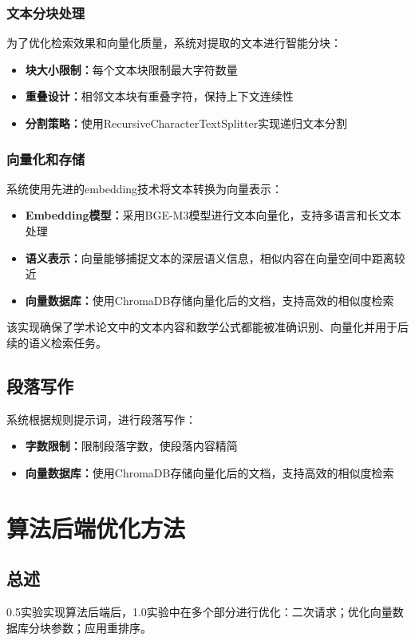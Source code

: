 \documentclass[12pt,a4paper]{article}
\begin{document}
\subsubsection{文本分块处理}
为了优化检索效果和向量化质量，系统对提取的文本进行智能分块：
\begin{itemize}
    \item \textbf{块大小限制：}每个文本块限制最大字符数量
    \item \textbf{重叠设计：}相邻文本块有重叠字符，保持上下文连续性
    \item \textbf{分割策略：}使用RecursiveCharacterTextSplitter实现递归文本分割
\end{itemize}

\subsubsection{向量化和存储}
系统使用先进的embedding技术将文本转换为向量表示：
\begin{itemize}
    \item \textbf{Embedding模型：}采用BGE-M3模型进行文本向量化，支持多语言和长文本处理
    \item \textbf{语义表示：}向量能够捕捉文本的深层语义信息，相似内容在向量空间中距离较近
    \item \textbf{向量数据库：}使用ChromaDB存储向量化后的文档，支持高效的相似度检索
\end{itemize}

该实现确保了学术论文中的文本内容和数学公式都能被准确识别、向量化并用于后续的语义检索任务。

\subsection{段落写作}
系统根据规则提示词，进行段落写作：
\begin{itemize}
    \item \textbf{字数限制：}限制段落字数，使段落内容精简
    \item \textbf{向量数据库：}使用ChromaDB存储向量化后的文档，支持高效的相似度检索
\end{itemize}


\section{算法后端优化方法}
\subsection{总述}
0.5实验实现算法后端后，1.0实验中在多个部分进行优化：二次请求；优化向量数据库分块参数；应用重排序。
\end{document}
